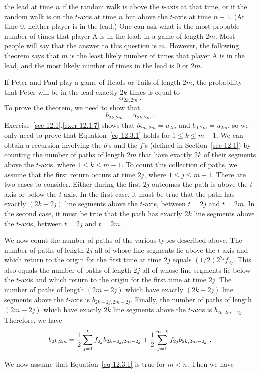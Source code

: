 the lead at time
$n$ if the random walk is above the
$t$-axis at that time, or if the random walk is on the $t$-axis at time $n$ but above the
$t$-axis at time
$n-1$.  (At time 0, neither player is in the lead.)  One can ask what is the most probable number
of times that player A is in the lead, in a game of length $2m$.  Most people will say that the
answer to this question is $m$.  However, the following theorem says that $m$ is the least likely
number of times that player A is in the lead, and the most likely number of times in the
lead is 0 or $2m$.
\begin{theorem}\label{thm 12.3.1}
If Peter and Paul play a game of Heads or Tails of length $2m$, the probability that Peter will
be in the lead exactly $2k$ times is equal to
$$
\alpha_{2k, 2m}\ .
$$
\proof
To prove the theorem, we need to show that
\begin{equation}  
b_{2k, 2m} = \alpha_{2k, 2m}\ .
\label{eq 12.3.1}  
\end{equation}
Exercise~\ref{sec 12.1}.\ref{exer 12.1.7} shows that $b_{2m, 2m} = u_{2m}$ and $b_{0, 2m} = u_{2m}$,
so we only need to prove that Equation~\ref{eq 12.3.1} holds for $1 \le k \le m-1$.  We can obtain a
recursion involving the $b$'s and the $f$'s (defined in Section~\ref{sec 12.1}) by counting the
number of paths of length $2m$ that have exactly $2k$ of their segments above the $t$-axis, where $1
\le k \le m-1$.  To count this collection of paths, we assume that the first return occurs at time
$2j$, where
$1 \le j \le m-1$.  There are two cases to consider.  Either during the first $2j$ outcomes the
path is above the $t$-axis or below the $t$-axis.  In the first case, it must be true that the
path has exactly $(2k - 2j)$ line segments above the $t$-axis, between $t = 2j$ and $t = 2m$. 
In the second case, it must be true that the path has exactly $2k$ line segments above the
$t$-axis, between $t = 2j$ and $t = 2m$.  
\par We now count the number of paths of the various types
described above.  The number of paths of length $2j$ all of whose line segments lie above the
$t$-axis and which return to the origin for the first time at time $2j$ equals
$(1/2)2^{2j}f_{2j}$.  This also equals the number of paths of length $2j$ all of whose line
segments lie below the $t$-axis and which return to the origin for the first time at time $2j$. 
The number of paths of length $(2m - 2j)$ which have exactly $(2k - 2j)$ line segments above the
$t$-axis is $b_{2k-2j, 2m-2j}$.  Finally, the number of paths of length $(2m-2j)$ which have
exactly $2k$ line segments above the $t$-axis is $b_{2k,2m-2j}$.  Therefore, we have
$$b_{2k,2m} = {1\over 2} \sum_{j = 1}^k f_{2j}b_{2k-2j, 2m-2j} + 
{1\over 2}\sum_{j = 1}^{m-k} f_{2j}b_{2k, 2m-2j}\ .$$
\par
We now assume that Equation~\ref{eq 12.3.1} is true for $m < n$.  Then we have


\end{theorem}
